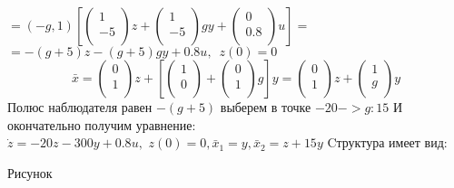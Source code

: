 \documentclass[preprint,russian,a5paper,10pt,twoside,mediummath]{ncc}
\begin{document}
$=(-g,1)\left[ \left( \begin{matrix}
   1  \\
   -5  \\
\end{matrix} \right)z+\left( \begin{matrix}
   1  \\
   -5  \\
\end{matrix} \right)gy+\left( \begin{matrix}
   0  \\
   0.8  \\
\end{matrix} \right)u \right]=$ 
$=-(g+5)z-(g+5)gy+0.8u,\,\,\,z(0)=0$ 
\[\bar{x}=\left( \begin{matrix}
   0  \\
   1  \\
\end{matrix} \right)z+\left[ \left( \begin{matrix}
   1  \\
   0  \\
\end{matrix} \right)+\left( \begin{matrix}
   0  \\
   1  \\
\end{matrix} \right)g \right]y=\left( \begin{matrix}
   0  \\
   1  \\
\end{matrix} \right)z+\left( \begin{matrix}
   1  \\
   g  \\
\end{matrix} \right)y\] 
Полюс наблюдателя равен $-(g+5)$ выберем в точке $-20 -> g:15 $ И окончательно получим уравнение: $\dot{z}=-20z-300y+0.8u,\,\,z(0)=0,{{\bar{x}}_{1}}=y,{{\bar{x}}_{2}}=z+15y$
Cтруктура имеет вид:

\par 
\par	Рисунок
\par

 
\end{document}

